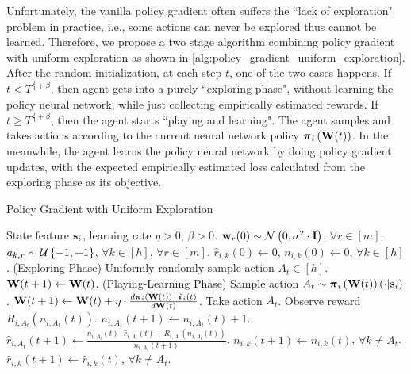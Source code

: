 Unfortunately, the vanilla policy gradient often suffers the ``lack of exploration" problem in practice, i.e., some actions can never be explored thus cannot be learned. Therefore, we propose a two stage algorithm combining policy gradient with uniform exploration as shown in \cref{alg:policy_gradient_uniform_exploration}. After the random initialization, at each step $t$, one of the two cases happens. If $t < T^{\frac{2}{3} + \beta}$, then agent gets into a purely ``exploring phase", without learning the policy neural network, while just collecting empirically estimated rewards. If $t \ge T^{\frac{2}{3} + \beta}$, then the agent starts ``playing and learning". The agent samples and takes actions according to the current neural network policy ${\boldsymbol{\pi}}_{i}\left({\mathbf{W}}(t)\right)$. In the meanwhile, the agent learns the policy neural network by doing policy gradient updates, with the expected empirically estimated loss calculated from the exploring phase as its objective.

\begin{algorithm}[t]
   \caption{Policy Gradient with Uniform Exploration}
\label{alg:policy_gradient_uniform_exploration}
\begin{algorithmic}
    State feature ${\mathbf{s}}_i$, learning rate $\eta > 0$, $\beta > 0$.
   \STATE ${\mathbf{w}}_r(0) \sim {\mathcal{N}}\left( 0, \sigma^2 \cdot {\mathbf{I}} \right)$, $\forall r \in [m]$.
   \STATE $a_{k, r} \sim {\mathcal{U}}\left\{-1, +1\right\}$, $\forall k \in [h]$, $\forall r \in [m]$.
   \STATE $\hat{r}_{i,k}\left(0\right) \gets 0$, $n_{i,k}\left(0\right) \gets 0$, $\forall k \in [h]$.
   \STATE (Exploring Phase)
   \STATE Uniformly randomly sample action $A_{t} \in [h]$.
   \STATE ${\mathbf{W}}(t+1) \leftarrow {\mathbf{W}}(t)$.
   \ELSE
   \STATE (Playing-Learning Phase)
   \STATE Sample action $A_{t} \sim {\boldsymbol{\pi}}_{i}\left({\mathbf{W}}(t)\right)\left(\cdot \middle| {\mathbf{s}}_i \right)$.
   \STATE ${\mathbf{W}}(t+1) \leftarrow {\mathbf{W}}(t) + \eta \cdot \frac{d {\boldsymbol{\pi}}_{i}\left({\mathbf{W}}(t)\right)^\top \hat{{\mathbf{r}}}_i \left(t\right)}{d {\mathbf{W}}(t)}$.
   \ENDIF
   \STATE Take action $A_{t}$. Observe reward $R_{i, A_{t}}\left(n_{i, A_{t}}\left(t\right) \right)$.
   \STATE $n_{i, A_{t}}\left(t+1\right) \gets n_{i, A_{t}}\left(t\right) + 1$.
   \STATE $\hat{r}_{i,A_{t}}\left(t+1\right) \gets \frac{n_{i, A_{t}}\left(t\right) \cdot \hat{r}_{i,A_{t}}\left(t\right) + R_{i, A_{t}}\left(n_{i, A_{t}}\left(t\right)\right) }{n_{i, A_{t}}\left(t+1\right)}$.
   \STATE $n_{i, k}\left(t+1\right) \gets n_{i, k}\left(t\right)$, $\forall k \not= A_t$.
   \STATE $\hat{r}_{i,k}\left(t+1\right) \gets \hat{r}_{i,k}\left(t\right)$, $\forall k \not= A_t$.
   \ENDFOR
\end{algorithmic}
\end{algorithm}

